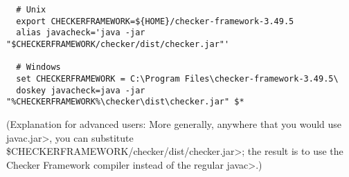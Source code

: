 \begin{itemize}
\begin{Verbatim}
  # Unix
  export CHECKERFRAMEWORK=${HOME}/checker-framework-3.49.5
  alias javacheck='java -jar "$CHECKERFRAMEWORK/checker/dist/checker.jar"'

  # Windows
  set CHECKERFRAMEWORK = C:\Program Files\checker-framework-3.49.5\
  doskey javacheck=java -jar "%CHECKERFRAMEWORK%\checker\dist\checker.jar" $*
\end{Verbatim}

  (Explanation for advanced users:
  More generally, anywhere that you would use \<javac.jar>, you can substitute
  \<\$CHECKERFRAMEWORK/checker/dist/checker.jar>;
  the result is to use the Checker
  Framework compiler instead of the regular \<javac>.)

\end{itemize}



%
%
%
%
%
%
%
%
%


